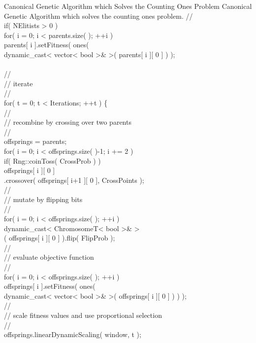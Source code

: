 \begin{programlisting}{Canonical Genetic Algorithm which Solves the Counting Ones Problem}{
    Canonical Genetic Algorithm which solves the counting ones problem.}
    //\\
    if( NElitists > 0 )\\
        for( i = 0; i < parents.size( ); ++i )\\
            parents[ i ].setFitness( ones(\\
                dynamic_cast< vector< bool >& >( parents[ i ][ 0 ] ) );\\
\\
    //\\
    // iterate\\
    //\\
    for( t = 0; t < Iterations; ++t ) \{\\
        //\\
        // recombine by crossing over two parents\\
        //\\
        offsprings = parents;\\
        for( i = 0; i < offsprings.size( )-1; i += 2 )\\
            if( Rng::coinToss( CrossProb ) )\\
                offsprings[ i ][ 0 ]\\
                    .crossover( offsprings[ i+1 ][ 0 ], CrossPoints );\\
        //\\
        // mutate by flipping bits\\
        //\\
        for( i = 0; i < offsprings.size( ); ++i )\\
            dynamic_cast< ChromosomeT< bool >& >\\
                ( offsprings[ i ][ 0 ] ).flip( FlipProb );\\
        //\\
        // evaluate objective function\\
        //\\
        for( i = 0; i < offsprings.size( ); ++i )\\
            offsprings[ i ].setFitness( ones(\\
                dynamic_cast< vector< bool >& >( offsprings[ i ][ 0 ] ) ) );\hspace{-10ex}\\
        //\\
        // scale fitness values and use proportional selection\\
        //\\
        offsprings.linearDynamicScaling( window, t );\\

\end{programlisting}
